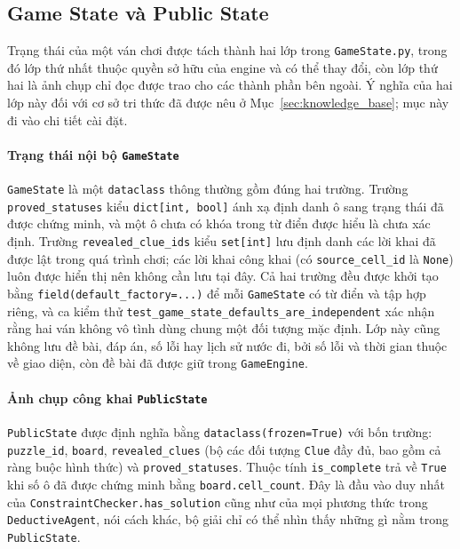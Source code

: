 \subsection{Game State và Public State}
\label{sec:game_state}
\begin{sloppypar}

Trạng thái của một ván chơi được tách thành hai lớp trong \texttt{GameState.py},
trong đó lớp thứ nhất thuộc quyền sở hữu của engine và có thể thay đổi, còn lớp
thứ hai là ảnh chụp chỉ đọc được trao cho các thành phần bên ngoài. Ý nghĩa của
hai lớp này đối với cơ sở tri thức đã được nêu ở Mục~\ref{sec:knowledge_base};
mục này đi vào chi tiết cài đặt.

\paragraph{Trạng thái nội bộ \texttt{GameState}}
\texttt{GameState} là một \texttt{dataclass} thông thường gồm đúng hai trường.
Trường \texttt{proved\_statuses} kiểu \texttt{dict[int, bool]} ánh xạ định danh
ô sang trạng thái đã được chứng minh, và một ô chưa có khóa trong từ điển được
hiểu là chưa xác định. Trường \texttt{revealed\_clue\_ids} kiểu \texttt{set[int]}
lưu định danh các lời khai đã được lật trong quá trình chơi; các lời khai công
khai (có \texttt{source\_cell\_id} là \texttt{None}) luôn được hiển thị nên không
cần lưu tại đây. Cả hai trường đều được khởi tạo bằng
\texttt{field(default\_factory=...)} để mỗi \texttt{GameState} có từ điển và tập
hợp riêng, và ca kiểm thử \texttt{test\_game\_state\_defaults\_are\_independent}
xác nhận rằng hai ván không vô tình dùng chung một đối tượng mặc định. Lớp này
cũng không lưu đề bài, đáp án, số lỗi hay lịch sử nước đi, bởi số lỗi và thời
gian thuộc về giao diện, còn đề bài đã được giữ trong \texttt{GameEngine}.

\paragraph{Ảnh chụp công khai \texttt{PublicState}}
\texttt{PublicState} được định nghĩa bằng \texttt{dataclass(frozen=True)} với
bốn trường: \texttt{puzzle\_id}, \texttt{board}, \texttt{revealed\_clues} (bộ
các đối tượng \texttt{Clue} đầy đủ, bao gồm cả ràng buộc hình thức) và
\texttt{proved\_statuses}. Thuộc tính \texttt{is\_complete} trả về \texttt{True}
khi số ô đã được chứng minh bằng \texttt{board.cell\_count}. Đây là đầu vào duy
nhất của \texttt{ConstraintChecker.has\_solution} cũng như của mọi phương thức
trong \texttt{DeductiveAgent}, nói cách khác, bộ giải chỉ có thể nhìn thấy những
gì nằm trong \texttt{PublicState}.


\end{sloppypar}
